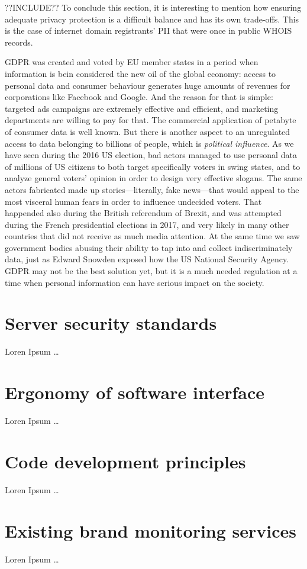 ??INCLUDE?? To conclude this section, it is interesting to mention how ensuring
adequate privacy protection is a difficult balance and has its own trade-offs. This is
the case of internet domain registrants' PII that were once in public WHOIS
records.

GDPR was created and voted by EU member states in a period when information is
bein considered the new oil of the global economy: access to personal data and
consumer behaviour generates huge amounts of revenues for corporations like
Facebook and Google. And the reason for that is simple: targeted ads campaigns
are extremely effective and efficient, and marketing departments are willing to pay
for that. The commercial application of petabyte of consumer data is well known.
But there is another aspect to an unregulated access to data belonging to
billions of people, which is \emph{political influence}. As we have seen during
the 2016 US election, bad actors managed to use personal data of millions of US
citizens to both target specifically voters in swing states, and to analyze
general voters' opinion in order to design very effective slogans. The same
actors fabricated made up stories---literally, fake news---that would appeal to
the most visceral human fears in order to influence undecided voters. That
happended also during the British referendum of Brexit, and was attempted during
the French presidential elections in 2017, and very likely in many other
countries that did not receive as much media attention. At the same time we
saw government bodies abusing their ability to tap into and collect
indiscriminately data, just as Edward Snowden exposed how the US National
Security Agency. GDPR may not be the best solution yet, but it is a much needed
regulation at a time when personal information can have serious impact on the
society.

\section{Server security standards}
Loren Ipsum \ldots

\section{Ergonomy of software interface}
Loren Ipsum \ldots

\section{Code development principles}
Loren Ipsum \ldots

\section{Existing brand monitoring services}
Loren Ipsum \ldots